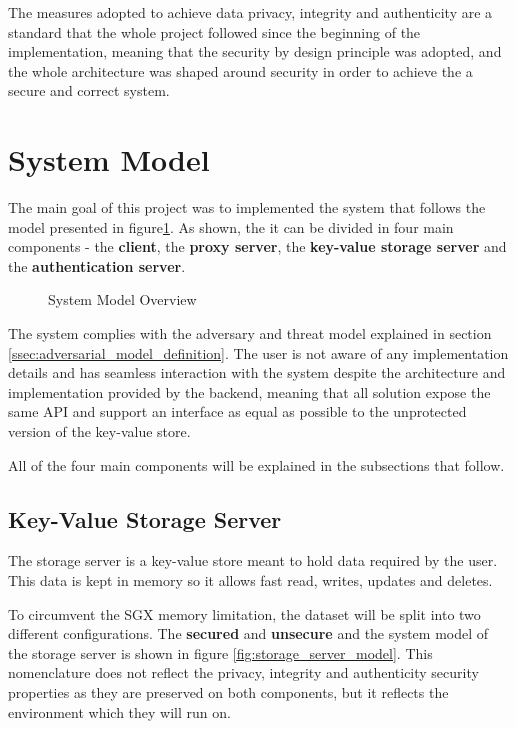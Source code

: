 The measures adopted to achieve data privacy, integrity and authenticity are a standard that the whole project followed since the beginning of the implementation, meaning that the security by design principle was adopted, and the whole architecture was shaped around security in order to achieve the a secure and correct system. 

\section{System Model} %
\label{sec:system_model}

The main goal of this project was to implemented the system that follows the model presented in figure\ref{fig:system_model_overview}. As shown, the it can be divided in four main components - the \textbf{client}, the \textbf{proxy server}, the \textbf{key-value storage server} and the \textbf{authentication server}.

\begin{figure}[htbp]
  \caption{System Model Overview}
  \label{fig:system_model_overview}
\end{figure}

The system complies with the adversary and threat model explained in section \ref{ssec:adversarial_model_definition}. The user is not aware of any implementation details and has seamless interaction with the system despite the architecture and implementation provided by the backend, meaning that all solution expose the same \gls{API} and support an interface as equal as possible to the unprotected version of the key-value store. 

All of the four main components will be explained in the subsections that follow.

\subsection{Key-Value Storage Server}
\label{ssec:key-value_storage_server}

The storage server is a key-value store meant to hold data required by the user. This data is kept in memory so it allows fast read, writes, updates and deletes.

To circumvent the \gls{SGX} memory limitation, the dataset will be split into two different configurations. The \textbf{secured} and \textbf{unsecure} and the system model of the storage server is shown in figure \ref{fig:storage_server_model}. This nomenclature does not reflect the privacy, integrity and authenticity security properties as they are preserved on both components, but it reflects the environment which they will run on.

